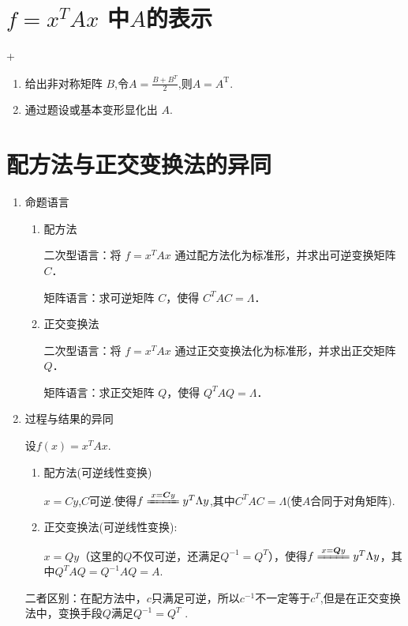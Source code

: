 \section{$f=x^TAx$ 中$A$的表示}
\DOne+\DTwoThree

\begin{enumerate}
    \item 给出非对称矩阵 $B$,令$A=\frac{B+B^T}{2}$,则$A=A^\mathrm{T}.$
    \item 通过题设或基本变形显化出 $A.$
\end{enumerate}

\section{配方法与正交变换法的异同}

\begin{enumerate}
    \item 命题语言
          \DTwoTwo
          \begin{enumerate}
              \item 配方法

                    二次型语言：将 $f = x^T A x$ 通过配方法化为标准形，并求出可逆变换矩阵 $C$．

                    矩阵语言：求可逆矩阵 $C$，使得 $C^T A C = \Lambda$．
              \item 正交变换法

                    二次型语言：将 $f = x^T A x$ 通过正交变换法化为标准形，并求出正交矩阵 $Q$．

                    矩阵语言：求正交矩阵 $Q$，使得 $Q^T A Q = \Lambda$．
          \end{enumerate}
    \item 过程与结果的异同
          \DTwoThree

          设$f(x)=x^TAx$.
          \begin{enumerate}
              \item 配方法(可逆线性变换)

                    $x=Cy$,$C$可逆.使得$f\xlongequal{x=\boldsymbol{C}y}y^T\Lambda y$,其中$C^TAC=\Lambda$(使$A$合同于对角矩阵).
              \item 正交变换法(可逆线性变换):

                    $x=Qy$（这里的$Q$不仅可逆，还满足$Q^{-1}=Q^{T}$），使得$f\xlongequal{x=\boldsymbol{Q}y}y^T\Lambda y$，其中$Q^{T}AQ=Q^{-1}AQ=A$.
          \end{enumerate}
          二者区别：在配方法中，$c$只满足可逆，所以$c^{-1}$不一定等于$c^T$,但是在正交变换法中，变换手段$Q$满足$Q^{- 1}= Q^T$ .


\end{enumerate}
